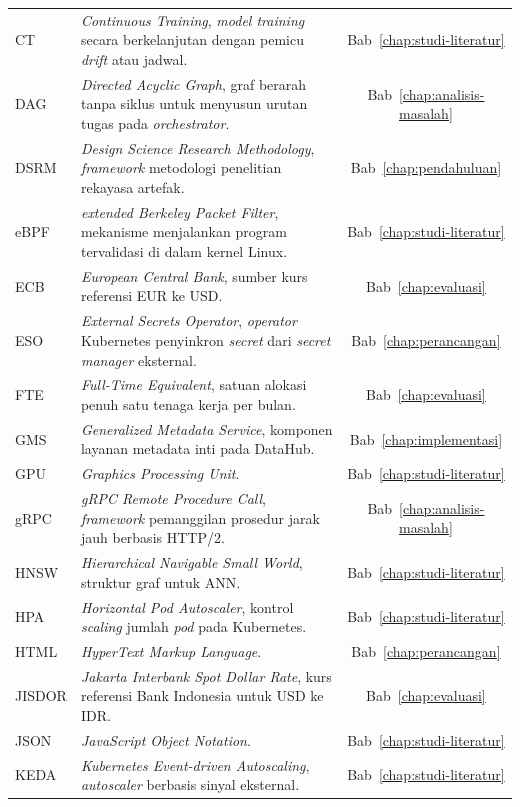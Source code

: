 \begin{longtable}{@{} l >{\raggedright\arraybackslash}p{8cm} c @{}}
CT & \textit{Continuous Training}, \textit{model training} secara berkelanjutan dengan pemicu \textit{drift} atau jadwal. & Bab~\ref{chap:studi-literatur} \\
DAG & \textit{Directed Acyclic Graph}, graf berarah tanpa siklus untuk menyusun urutan tugas pada \textit{orchestrator}. & Bab~\ref{chap:analisis-masalah} \\
DSRM & \textit{Design Science Research Methodology}, \textit{framework} metodologi penelitian rekayasa artefak. & Bab~\ref{chap:pendahuluan} \\
eBPF & \textit{extended Berkeley Packet Filter}, mekanisme menjalankan program tervalidasi di dalam kernel Linux. & Bab~\ref{chap:studi-literatur} \\
ECB & \textit{European Central Bank}, sumber kurs referensi EUR ke USD. & Bab~\ref{chap:evaluasi} \\
ESO & \textit{External Secrets Operator}, \textit{operator} Kubernetes penyinkron \textit{secret} dari \textit{secret manager} eksternal. & Bab~\ref{chap:perancangan} \\
FTE & \textit{Full-Time Equivalent}, satuan alokasi penuh satu tenaga kerja per bulan. & Bab~\ref{chap:evaluasi} \\
GMS & \textit{Generalized Metadata Service}, komponen layanan metadata inti pada DataHub. & Bab~\ref{chap:implementasi} \\
GPU & \textit{Graphics Processing Unit}. & Bab~\ref{chap:studi-literatur} \\
gRPC & \textit{gRPC Remote Procedure Call}, \textit{framework} pemanggilan prosedur jarak jauh berbasis HTTP/2. & Bab~\ref{chap:analisis-masalah} \\
HNSW & \textit{Hierarchical Navigable Small World}, struktur graf untuk ANN. & Bab~\ref{chap:studi-literatur} \\
HPA & \textit{Horizontal Pod Autoscaler}, kontrol \textit{scaling} jumlah \textit{pod} pada Kubernetes. & Bab~\ref{chap:studi-literatur} \\
HTML & \textit{HyperText Markup Language}. & Bab~\ref{chap:perancangan} \\
JISDOR & \textit{Jakarta Interbank Spot Dollar Rate}, kurs referensi Bank Indonesia untuk USD ke IDR. & Bab~\ref{chap:evaluasi} \\
JSON & \textit{JavaScript Object Notation}. & Bab~\ref{chap:studi-literatur} \\
KEDA & \textit{Kubernetes Event-driven Autoscaling}, \textit{autoscaler} berbasis sinyal eksternal. & Bab~\ref{chap:studi-literatur} \\

\end{longtable}
